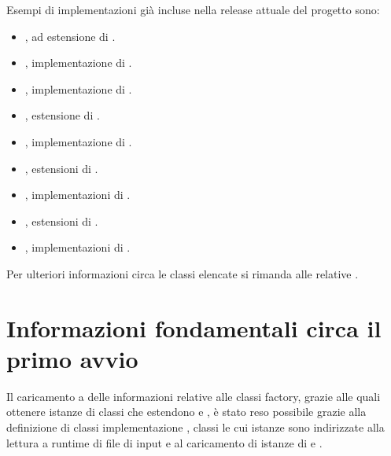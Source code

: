 \documentclass[letterpaper,10pt,italian,openany,oneside]{sphinxmanual}
\begin{document}
Esempi di implementazioni già incluse nella release attuale del progetto sono:
\begin{itemize}
\item {} 
, ad estensione di .

\item {} 
, implementazione di .

\item {} 
, implementazione di .

\item {} 
, estensione di .

\item {} 
, implementazione di .

\item {} 
, estensioni di .

\item {} 
, implementazioni di .

\item {} 
, estensioni di .

\item {} 
, implementazioni di .

\end{itemize}

Per ulteriori informazioni circa le classi elencate si rimanda alle relative {\hyperref[\detokenize{source/packages::doc}]{}}.


\section{Informazioni fondamentali circa il primo avvio}
\label{\detokenize{introduzione:informazioni-fondamentali-circa-il-primo-avvio}}
Il caricamento a  delle informazioni relative alle classi factory, grazie alle quali ottenere istanze di classi che estendono
 e , è stato reso possibile grazie alla definizione di classi implementazione , classi le cui istanze sono indirizzate
alla lettura a runtime di file di input e al caricamento di istanze di  e .
\end{document}
